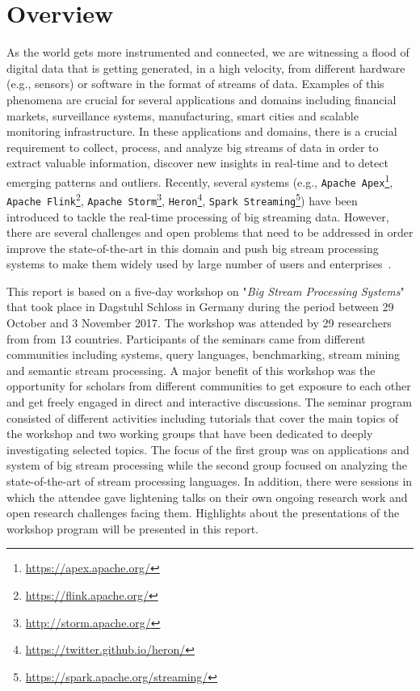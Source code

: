 \section{Overview}\label{sec:overview}

As the world gets more instrumented and connected, we are witnessing a flood of digital data that is getting generated, in a high velocity, from different hardware (e.g., sensors) or software in the format of streams of data. Examples of this phenomena are crucial for several
applications and domains including financial markets, surveillance systems, manufacturing, smart cities and scalable monitoring infrastructure. In these applications and domains, there is a crucial requirement to collect, process, and analyze big streams of data in order to extract valuable information, discover new insights in real-time and to detect emerging patterns and outliers. Recently, several systems (e.g., \texttt{Apache Apex}\footnote{\url{https://apex.apache.org/}}, \texttt{Apache Flink}\footnote{\url{https://flink.apache.org/}}, \texttt{Apache Storm}\footnote{\url{http://storm.apache.org/}}, \texttt{Heron}\footnote{\url{https://twitter.github.io/heron/}}, \texttt{Spark Streaming}\footnote{\url{https://spark.apache.org/streaming/}}) have been introduced to tackle the real-time processing of big streaming data. However, there are several challenges and open problems that need to be addressed in order improve the state-of-the-art in this domain and push big stream processing systems to make them widely used by large number of users and enterprises~\cite{sakr2016big}.

This report is based on a five-day workshop on "\emph{Big Stream Processing Systems}" that took place in Dagstuhl Schloss  in Germany during the period between 29 October and 3 November 2017. The workshop was attended by 29 researchers from  from 13 countries. Participants of the seminars came from different communities including systems, query languages,
benchmarking, stream mining and semantic stream processing. A major benefit of this workshop was the opportunity for scholars from different communities to
get  exposure to each other and get freely engaged in direct and interactive discussions. The seminar program consisted of different activities including  tutorials that cover the main topics of the workshop and two working groups that have been dedicated to deeply investigating selected topics. The focus of the first group was on applications and system of big stream processing while the second group focused on analyzing the state-of-the-art of stream processing languages. In addition, there were sessions
in which the attendee gave lightening talks on
their own ongoing research work and open research challenges facing them. Highlights about the presentations of the workshop program will be presented in this report.








